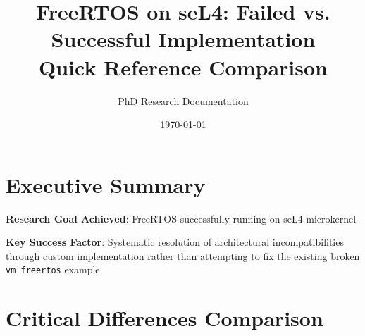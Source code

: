 \documentclass[12pt]{article}
\title{FreeRTOS on seL4: Failed vs. Successful Implementation\\
       \large Quick Reference Comparison}
\author{PhD Research Documentation}
\date{\today}
\begin{document}
\maketitle

\section{Executive Summary}

\textbf{Research Goal Achieved}: FreeRTOS successfully running on seL4 microkernel

\textbf{Key Success Factor}: Systematic resolution of architectural incompatibilities through custom implementation rather than attempting to fix the existing broken \texttt{vm\_freertos} example.

\section{Critical Differences Comparison}
\end{document}
